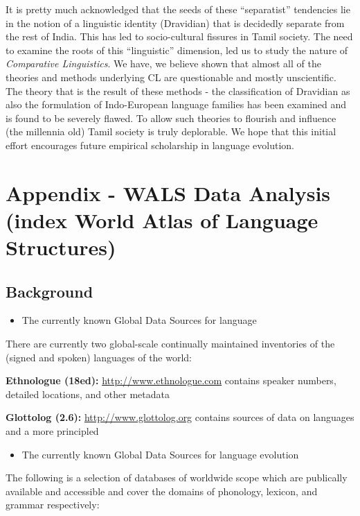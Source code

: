 It is pretty much acknowledged that the seeds of these “separatist” tendencies lie in the notion of a linguistic identity (Dravidian) that is decidedly separate from the rest of India. This has led to socio-cultural fissures in Tamil society. The need to examine the roots of this “linguistic” dimension, led us to study the nature of \textit{Comparative Linguistics}. We have, we believe shown that almost all of the theories and methods underlying CL are questionable and mostly unscientific. The theory that is the result of these methods - the classification of Dravidian as also the formulation of Indo-European language families has been examined and is found to be severely flawed. To allow such theories to flourish and influence (the millennia old) Tamil society is truly deplorable. We hope that this initial effort encourages future empirical scholarship in language evolution.


\section*{Appendix - WALS Data Analysis (index World Atlas of Language Structures)}

\subsection*{Background\protect\endnote{}}

\begin{itemize}
\item The currently known Global Data Sources for language

\end{itemize}

There are currently two global-scale continually maintained inventories of the (signed and spoken) languages of the world:

\textbf{Ethnologue (18ed):} \url{http://www.ethnologue.com} contains speaker numbers, detailed locations, and other metadata

\textbf{Glottolog (2.6):} \url{http://www.glottolog.org} contains sources of data on languages and a more principled

\begin{itemize}
\item The currently known Global Data Sources for language evolution

\end{itemize}

The following is a selection of databases of worldwide scope which are publically available and accessible and cover the domains of phonology, lexicon, and grammar respectively:

